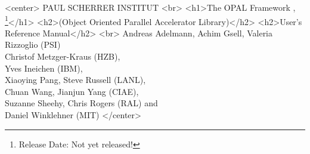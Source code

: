 \documentclass[a4paper]{book}
\begin{document}
\begin{titlepage}

\begin{htmlonly}
\begin{rawhtml}
<center>
PAUL SCHERRER INSTITUT
<br>
<h1>The OPAL Framework , \opalversion{} \footnote{Release Date: Not yet released!}</h1>
<h2>(Object Oriented Parallel Accelerator Library)</h2>
<h2>User's Reference Manual</h2>
<br>
Andreas Adelmann, Achim Gsell, Valeria Rizzoglio (PSI)\\ Christof Metzger-Kraus (HZB), \\ Yves Ineichen (IBM),\\ Xiaoying Pang, Steve Russell (LANL),\\ Chuan Wang, Jianjun Yang (CIAE), \\  Suzanne Sheehy, Chris Rogers (RAL) and \\ Daniel Winklehner (MIT)
</center>
\end{rawhtml}
\end{htmlonly}



\end{titlepage}
\end{document}
